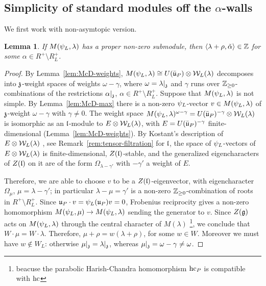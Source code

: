 \documentclass{article}
\theoremstyle{plain}
\newtheorem{lemma}[theorem]{Lemma}
\theoremstyle{definition}
\theoremstyle{remark}
\numberwithin{equation}{section}
\begin{document}
\subsection{Simplicity of standard modules off the \texorpdfstring{$\alpha$}{alpha}-walls}\label{sec:simple}

We first work with non-asymtopic version.
\begin{lemma}\label{lem:submodule}
If $M(\psi_L,\lambda)$ has a proper non-zero submodule, then $\langle\lambda+\rho,\check\alpha\rangle\in\mathbb{Z}$ for some $\alpha\in R^+\setminus R^+_L$.
\end{lemma}

\begin{proof}
By Lemma~\ref{lem:McD-weights}, $M(\psi_L,\lambda)\cong U(\bar{\mathfrak{u}}_P)\otimes\mathcal{W}_L(\lambda)$ decomposes into $\mathfrak{z}$-weight spaces of weights $\omega-\gamma$, where $\omega=\lambda|_{\mathfrak{z}}$ and $\gamma$ runs over $\mathbb{Z}_{\geq0}$-combinations of the restrictions $\alpha|_{\mathfrak{z}}$, $\alpha\in R^+\setminus R^+_L$. Suppose that $M(\psi_L,\lambda)$ is not simple. By Lemma~\ref{lem:McD-max} there is a non-zero $\psi_L$-vector $v\in M(\psi_L,\lambda)$ of $\mathfrak{z}$-weight $\omega-\gamma$ with $\gamma\neq0$. The weight space $M(\psi_L,\lambda)^{\omega-\gamma}=U(\bar{\mathfrak{u}}_P)^{-\gamma}\otimes\mathcal{W}_L(\lambda)$ is isomorphic as an $\mathfrak{l}$-module to $E\otimes\mathcal{W}_L(\lambda)$, with $E=U(\bar{\mathfrak{u}}_P)^{-\gamma}$ finite-dimensional (Lemma~\ref{lem:McD-weights}). By Kostant's description of $E\otimes\mathcal{W}_L(\lambda)$ , see Remark~\ref{rem:tensor-filtration} for $\mathfrak{l}$, the space of $\psi_L$-vectors of $E\otimes\mathcal{W}_L(\lambda)$ is finite-dimensional, $Z(\mathfrak{l})$-stable, and the generalized eigencharacters of $Z(\mathfrak{l})$ on it are of the form $\Omega_{\lambda-\gamma'}$ with $-\gamma'$ a weight of $E$.

Therefore, we are able to choose $v$ to be a $Z(\mathfrak{l})$-eigenvector, with eigencharacter $\Omega_\mu$, $\mu=\lambda-\gamma'$; in particular $\lambda-\mu=\gamma'$ is a non-zero $\mathbb{Z}_{\geq0}$-combination of roots in $R^+\setminus R^+_L$. Since $\mathfrak{u}_P\cdot v=\psi_L(\mathfrak{u}_P)v=0$, Frobenius reciprocity gives a non-zero homomorphism $M(\psi_L,\mu)\to M(\psi_L,\lambda)$ sending the generator to $v$. Since $Z(\mathfrak{g})$ acts on $M(\psi_L,\lambda)$ through the central character of $M(\lambda)$ \footnote{beacuse the parabolic Harish-Chandra homomorphism $\operatorname{hc}_P$ is compatible with $\operatorname{hc}$}, we conclude that $W\cdot\mu=W\cdot\lambda$. Therefore, $\mu+\rho=w(\lambda+\rho)$, for some $w\in W$. Moreover we must have $w\notin W_L$: otherwise $\mu|_{\mathfrak{z}}=\lambda|_{\mathfrak{z}}$, whereas $\mu|_{\mathfrak{z}}=\omega-\gamma\neq\omega$.


\end{proof}
\end{document}
